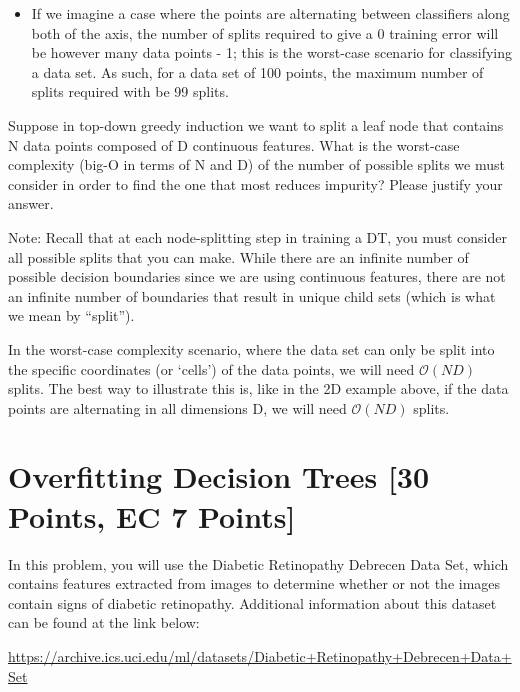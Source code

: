 \begin{solution}
\begin{itemize}
        \item If we imagine a case where the points are alternating between classifiers along both of the axis, the number of splits required to give a 0 training error will be however many data points - 1; this is the worst-case scenario for classifying a data set. As such, for a data set of 100 points, the maximum number of splits required with be 99 splits.
    \end{itemize}
 
\end{solution}

\problem[4] Suppose in top-down greedy induction we want to split a leaf node that contains N data points composed of
D continuous features. What is the worst-case
complexity (big-O in terms of N and D) of the number of possible splits we must consider in order to find the one that most reduces impurity? Please justify your answer.

Note: Recall that at each node-splitting step in training a DT, you must consider all possible splits that you can make. While there are an infinite number of possible decision boundaries since we are using continuous features, there are not an infinite number of boundaries that result in unique child sets (which is what we mean by ``split'').

\begin{solution}
   In the worst-case complexity scenario, where the data set can only be split into the specific coordinates (or `cells') of the data points, we will need $\mathcal{O}(ND)$ splits. The best way to illustrate this is, like in the 2D example above, if the data points are alternating in all dimensions D, we will need $\mathcal{O}(ND)$ splits. 
\end{solution}


\newpage


\section{Overfitting Decision Trees [30 Points, EC 7 Points]}

In this problem, you will use the Diabetic Retinopathy Debrecen Data Set, which contains features extracted from images to determine whether or not the images contain signs of diabetic retinopathy. Additional information about this dataset can be found at the link below:

\url{https://archive.ics.uci.edu/ml/datasets/Diabetic+Retinopathy+Debrecen+Data+Set}

